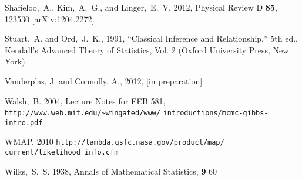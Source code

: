 \documentclass[useAMS,usenatbib]{aastex}
\begin{document}
\begin{thebibliography}{99}
Shafieloo,~A., Kim,~A.~G., and Linger,~E.~V. 2012,
Physical Review D {\bf 85}, 123530 [arXiv:1204.2272]

Stuart,~A. and Ord,~J.~K., 1991, ``Classical Inference and Relationship,''
5th ed., Kendall's Advanced Theory of Statistics, Vol. 2
(Oxford University Press, New York).

Vanderplas, J. and Connolly, A., 2012, [in preparation]

Walsh,~B. 2004, Lecture Notes for EEB 581,
\verb|http://www.web.mit.edu/~wingated/www/|
\verb|introductions/mcmc-gibbs-intro.pdf|

WMAP, 2010
\verb|http://lambda.gsfc.nasa.gov/product/map/|
\verb|current/likelihood_info.cfm|

Wilks,~S.~S. 1938, Annals of Mathematical Statistics, {\bf 9} 60

\end{thebibliography} 

\label{lastpage}
\end{document}
